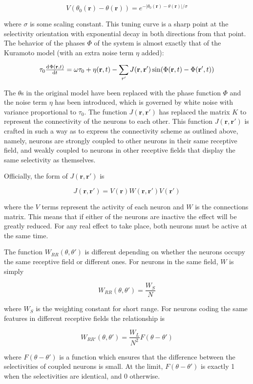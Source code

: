 \documentclass[12pt]{article}
\begin{document}
$$ V(\theta_0(\mathbf{r})-\theta(\mathbf{r}))=e^{-|\theta_0(\mathbf{r})-\theta(\mathbf{r})|/\sigma} $$

where $\sigma$ is some scaling constant.  This tuning curve is a sharp point at the selectivity orientation with exponential decay in both directions from that point.  The behavior of the phases $\Phi$ of the system is almost exactly that of the Kuramoto model (with an extra noise term $\eta$ added):

$$ \tau_0\od{\Phi(\mathbf{r},t)}{t}=\omega\tau_0+\eta(\mathbf{r},t)-\sum\limits_{r'}J(\mathbf{r},\mathbf{r}')\sin(\Phi(\mathbf{r},t)-\Phi(\mathbf{r'},t)) $$

The $\theta$s in the original model have been replaced with the phase function $\Phi$ and the noise term $\eta$ has been introduced, which is governed by white noise with variance proportional to $\tau_0$.  The function $J(\mathbf{r},\mathbf{r'})$ has replaced the matrix $K$ to represent the connectivity of the neurons to each other.  This function $J(\mathbf{r},\mathbf{r'})$ is crafted in such a way as to express the connectivity scheme as outlined above, namely, neurons are strongly coupled to other neurons in their same receptive field, and weakly coupled to neurons in other receptive fields that display the same selectivity as themselves.  

Officially, the form of $J(\mathbf{r},\mathbf{r'})$ is

$$ J(\mathbf{r},\mathbf{r'})=V(\mathbf{r})W(\mathbf{r},\mathbf{r'})V(\mathbf{r'}) $$

where the $V$ terms represent the activity of each neuron and $W$ is the connections matrix.  This means that if either of the neurons are inactive the effect will be greatly reduced.  For any real effect to take place, both neurons must be active at the same time.  

The function $W_{RR}(\theta,\theta')$ is different depending on whether the neurons occupy the same receptive field or different ones.  For neurons in the same field, $W$ is simply

$$ W_{RR}(\theta,\theta')=\frac{W_S}{N} $$

where $W_S$ is the weighting constant for short range.  For neurons coding the same features in different receptive fields the relationship is

$$ W_{RR'}(\theta,\theta')=\frac{W_L}{N^2}F(\theta-\theta') $$

where $F(\theta-\theta')$ is a function which ensures that the difference between the selectivities of coupled neurons is small.  At the limit, $F(\theta-\theta')$ is exactly 1 when the selectivities are identical, and 0 otherwise.  
\end{document}
